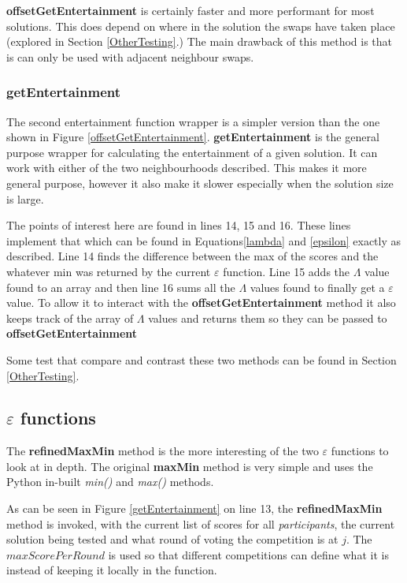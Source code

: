 \documentclass[12pt]{report}
\begin{document}
\textbf{offsetGetEntertainment} is certainly faster and more performant for most solutions. This does depend on where in the solution the swaps have taken place (explored in Section \ref{OtherTesting}.) The main drawback of this method is that is can only be used with adjacent neighbour swaps.

\subsubsection{getEntertainment}
The second entertainment function wrapper is a simpler version than the one shown in Figure \ref{offsetGetEntertainment}. \textbf{getEntertainment} is the general purpose wrapper for calculating the entertainment of a given solution. It can work with either of the two neighbourhoods described. This makes it more general purpose, however it also make it slower especially when the solution size is large.

The points of interest here are found in lines 14, 15 and 16. These lines implement that which can be found in Equations\ref{lambda} and \ref{epsilon} exactly as described. Line 14 finds the difference between the max of the scores and the whatever min was returned by the current $\varepsilon$ function. Line 15 adds the $\Lambda$ value found to an array and then line 16 sums all the $\Lambda$ values found to finally get a $\varepsilon$ value. To allow it to interact with the \textbf{offsetGetEntertainment} method it also keeps track of the array of $\Lambda$ values and returns them so they can be passed to \textbf{offsetGetEntertainment} 

Some test that compare and contrast these two methods can be found in Section \ref{OtherTesting}.

\subsection{$\varepsilon$ functions}\label{Imp-eFunctions}
The \textbf{refinedMaxMin} method is the more interesting of the two $\varepsilon$ functions to look at in depth. The original \textbf{maxMin} method is very simple and uses the Python in-built \textit{min()} \cite{PythonMin} and \textit{max()} \cite{PythonMax} methods.

As can be seen in Figure \ref{getEntertainment} on line 13, the \textbf{refinedMaxMin} method is invoked, with the current list of scores for all \textit{participants}, the current solution being tested and what round of voting the competition is at $j$. The $maxScorePerRound$ is used so that different competitions can define what it is instead of keeping it locally in the function.
\end{document}
